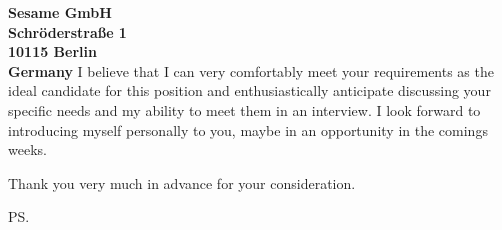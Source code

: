 \documentclass[a4paper]{joaosoares-letter}
\begin{document}
\begin{letter}{\bfseries Sesame GmbH\\Schröderstraße 1\\10115 Berlin\\Germany}
I believe that I can very comfortably meet your requirements as the ideal candidate for this position and enthusiastically anticipate discussing your specific needs and my ability to meet them in an interview. I look forward to introducing myself personally to you, maybe in an opportunity in the comings weeks.

\closing{ Thank you very much in advance for your consideration.}
\vspace{20pt}
\ps

\vspace{\fill}

\end{letter}
\end{document}

